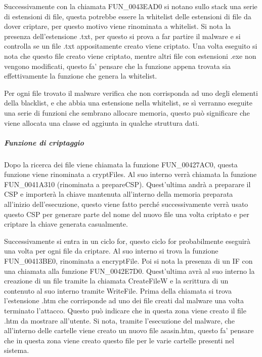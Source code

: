 \documentclass[a4paper,12pt]{article}
\begin{document}
 Successivamente con la chiamata FUN\_0043EAD0 si notano sullo stack una serie di estensioni di file, questa potrebbe essere la whitelist delle estensioni di file da dover criptare, per questo motivo viene rinominata a whitelist. Si nota la presenza dell'estensione .txt, per questo si prova a far partire il malware e si controlla se un file .txt appositamente creato viene criptato. Una volta eseguito si nota che questo file creato viene criptato, mentre altri file con estensioni .exe non vengono modificati, questo fa' pensare che la funzione appena trovata sia effettivamente la funzione che genera la whitelist. 

Per ogni file trovato il malware verifica che non corrisponda ad uno degli elementi della blacklist, e che abbia una estensione nella whitelist, se sì verranno eseguite una serie di funzioni che sembrano allocare memoria, questo può significare che viene allocata una classe ed aggiunta in qualche struttura dati. 

\subparagraph{Funzione di criptaggio}
Dopo la ricerca dei file viene chiamata la funzione FUN\_00427AC0, questa funzione viene rinominata a cryptFiles. Al suo interno verrà chiamata la funzione FUN\_0041A310 (rinominata a prepareCSP). Quest'ultima andrà a preparare il CSP e importerà la chiave mantenuta all'interno della memoria preparata all'inizio dell'esecuzione, questo viene fatto perché successivamente verrà usato questo CSP per generare parte del nome del nuovo file una volta criptato e per criptare la chiave generata casualmente.

Successivamente si entra in un ciclo for, questo ciclo for probabilmente eseguirà una volta per ogni file da criptare. Al suo interno si trova la funzione FUN\_00413BE0, rinominata a encryptFile. Poi si nota la presenza di un IF con una chiamata alla funzione FUN\_0042E7D0. Quest'ultima avrà al suo interno la creazione di un file tramite la chiamata CreateFileW e la scrittura di un contenuto al suo interno tramite WriteFile. Prima della chiamata si trova l'estensione .htm che corrisponde ad uno dei file creati dal malware una volta terminato l'attacco. Questo può indicare che in questa zona viene creato il file .htm da mostrare all'utente. Si nota, tramite l'esecuzione del malware, che all'interno delle cartelle viene creato un nuovo file asasin.htm, questo fa' pensare che in questa zona viene creato questo file per le varie cartelle presenti nel sistema.
\end{document}

